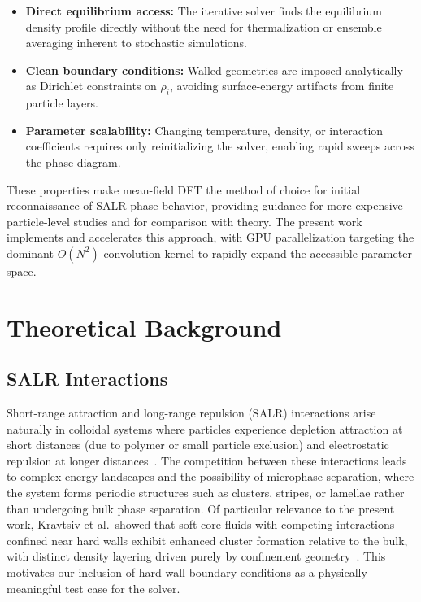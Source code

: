 \documentclass[conference]{IEEEtran}
\begin{document}
\begin{itemize}
    \item \textbf{Direct equilibrium access:} The iterative solver finds the equilibrium density profile directly without the need for thermalization or ensemble averaging inherent to stochastic simulations.
    \item \textbf{Clean boundary conditions:} Walled geometries are imposed analytically as Dirichlet constraints on $\rho_i$, avoiding surface-energy artifacts from finite particle layers.
    \item \textbf{Parameter scalability:} Changing temperature, density, or interaction coefficients requires only reinitializing the solver, enabling rapid sweeps across the phase diagram.
\end{itemize}

These properties make mean-field DFT the method of choice for initial reconnaissance of SALR phase behavior, providing guidance for more expensive particle-level studies and for comparison with theory. The present work implements and accelerates this approach, with GPU parallelization targeting the dominant $O(N^2)$ convolution kernel to rapidly expand the accessible parameter space.

\section{Theoretical Background}

\subsection{SALR Interactions}

Short-range attraction and long-range repulsion (SALR) interactions arise naturally in colloidal systems where particles experience depletion attraction at short distances (due to polymer or small particle exclusion) and electrostatic repulsion at longer distances~\cite{royall2018}. The competition between these interactions leads to complex energy landscapes and the possibility of microphase separation, where the system forms periodic structures such as clusters, stripes, or lamellae rather than undergoing bulk phase separation. Of particular relevance to the present work, Kravtsiv et al.\ showed that soft-core fluids with competing interactions confined near hard walls exhibit enhanced cluster formation relative to the bulk, with distinct density layering driven purely by confinement geometry~\cite{kravtsiv2022soft}. This motivates our inclusion of hard-wall boundary conditions as a physically meaningful test case for the solver.
\end{document}
